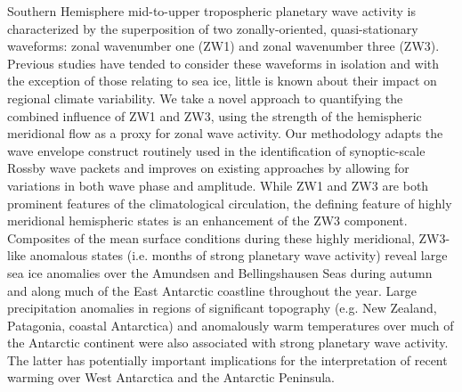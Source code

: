 Southern Hemisphere mid-to-upper tropospheric planetary wave activity is characterized by the superposition of two zonally-oriented, quasi-stationary waveforms: zonal wavenumber one (ZW1) and zonal wavenumber three (ZW3). Previous studies have tended to consider these waveforms in isolation and with the exception of those relating to sea ice, little is known about their impact on regional climate variability. We take a novel approach to quantifying the combined influence of ZW1 and ZW3, using the strength of the hemispheric meridional flow as a proxy for zonal wave activity. Our methodology adapts the wave envelope construct routinely used in the identification of synoptic-scale Rossby wave packets and improves on existing approaches by allowing for variations in both wave phase and amplitude. While ZW1 and ZW3 are both prominent features of the climatological circulation, the defining feature of highly meridional hemispheric states is an enhancement of the ZW3 component. Composites of the mean surface conditions during these highly meridional, ZW3-like anomalous states (i.e. months of strong planetary wave activity) reveal large sea ice anomalies over the Amundsen and Bellingshausen Seas during autumn and along much of the East Antarctic coastline throughout the year. Large precipitation anomalies in regions of significant topography (e.g. New Zealand, Patagonia, coastal Antarctica) and anomalously warm temperatures over much of the Antarctic continent were also associated with strong planetary wave activity. The latter has potentially important implications for the interpretation of recent warming over West Antarctica and the Antarctic Peninsula.
